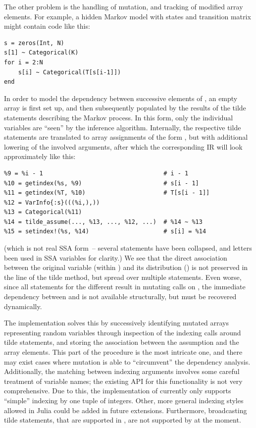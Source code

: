 The other problem is the handling of mutation, and tracking of modified array elements.  For
example, a hidden Markov model with states  and transition matrix  might contain
code like this:
\enlargethispage{\baselineskip}
\begin{lstlisting}
s = zeros(Int, N)
s[1] ~ Categorical(K)
for i = 2:N
    s[i] ~ Categorical(T[s[i-1]])
end
\end{lstlisting}
In order to model the dependency between successive elements of , an empty array is first
set up, and then subsequently populated by the results of the tilde statements describing the Markov
process.  In this form, only the individual variables  are \enquote{seen} by the
inference algorithm.  Internally, the respective tilde statements are translated to array
assignments of the form , but with additional lowering of the
involved arguments, after which the corresponding IR will look approximately like this:
\begin{lstlisting}
%9 = %i - 1                                  # i - 1
%10 = getindex(%s, %9)                       # s[i - 1]
%11 = getindex(%T, %10)                      # T[s[i - 1]]
%12 = VarInfo{:s}(((%i,),))
%13 = Categorical(%11)
%14 = tilde_assume(..., %13, ..., %12, ...)  # %14 ~ %13
%15 = setindex!(%s, %14)                     # s[i] = %14
\end{lstlisting}
(which is not real SSA form~-- several statements have been collapsed, and letters been used in SSA
variables for clarity.)  We see that the direct association between the original variable
 (within ) and its distribution () is not preserved in the line
of the tilde method, but spread over multiple statements.  Even worse, since all statements for the
different  result in mutating  calls on , the immediate
dependency between  and  is not available structurally, but must be
recovered dynamically.

The  implementation solves this by successively identifying mutated arrays
representing random variables through inspection of the indexing calls around tilde statements, and
storing the association between the assumption and the array elements.  This part of the procedure
is the most intricate one, and there may exist cases where mutation is able to \enquote{circumvent}
the dependency analysis.  Additionally, the matching between indexing arguments involves some
careful treatment of variable names; the existing \dppljl{} API for this functionality is not very
comprehensive.  Due to this, the implementation of \autogibbsjl{} currently only supports
\enquote{simple} indexing by one tuple of integers.  Other, more general indexing styles allowed in
Julia could be added in future extensions.  Furthermore, broadcasting tilde statements, that are
supported in \dppljl{}, are not supported by \autogibbsjl{} at the moment.


